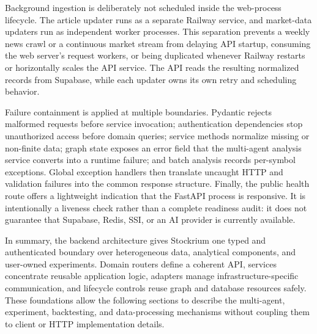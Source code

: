 Background ingestion is deliberately not scheduled inside the web-process lifecycle. The article updater runs as a separate Railway service, and market-data updaters run as independent worker processes. This separation prevents a weekly news crawl or a continuous market stream from delaying API startup, consuming the web server's request workers, or being duplicated whenever Railway restarts or horizontally scales the API service. The API reads the resulting normalized records from Supabase, while each updater owns its own retry and scheduling behavior.

Failure containment is applied at multiple boundaries. Pydantic rejects malformed requests before service invocation; authentication dependencies stop unauthorized access before domain queries; service methods normalize missing or non-finite data; graph state exposes an error field that the multi-agent analysis service converts into a runtime failure; and batch analysis records per-symbol exceptions. Global exception handlers then translate uncaught HTTP and validation failures into the common response structure. Finally, the public health route offers a lightweight indication that the FastAPI process is responsive. It is intentionally a liveness check rather than a complete readiness audit: it does not guarantee that Supabase, Redis, SSI, or an AI provider is currently available.

In summary, the backend architecture gives Stockrium one typed and authenticated boundary over heterogeneous data, analytical components, and user-owned experiments. Domain routers define a coherent API, services concentrate reusable application logic, adapters manage infrastructure-specific communication, and lifecycle controls reuse graph and database resources safely. These foundations allow the following sections to describe the multi-agent, experiment, backtesting, and data-processing mechanisms without coupling them to client or HTTP implementation details.
